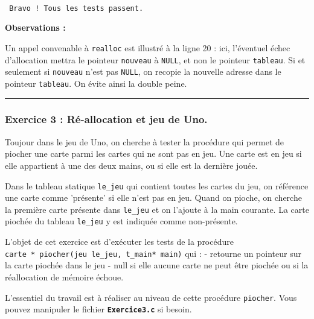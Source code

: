 \documentclass[11pt]{article}
\begin{document}
    \begin{Verbatim}[commandchars=\\\{\}]

 Bravo ! Tous les tests passent.

    \end{Verbatim}

    \textbf{Observations :}

Un appel convenable à \texttt{realloc} est illustré à la ligne 20 : ici,
l'éventuel échec d'allocation mettra le pointeur \texttt{nouveau} à
\texttt{NULL}, et non le pointeur \texttt{tableau}. Si et seulement si
\texttt{nouveau} n'est pas \texttt{NULL}, on recopie la nouvelle adresse
dans le pointeur \texttt{tableau}. On évite ainsi la double peine.

    \begin{center}\rule{0.5\linewidth}{\linethickness}\end{center}

    \subsubsection{Exercice 3 : Ré-allocation et jeu de
Uno.}\label{exercice-3-ruxe9-allocation-et-jeu-de-uno.}

Toujour dans le jeu de Uno, on cherche à tester la procédure qui permet
de piocher une carte parmi les cartes qui ne sont pas en jeu. Une carte
est en jeu si elle appartient à une des deux mains, ou si elle est la
dernière jouée.

Dans le tableau statique \texttt{le\_jeu} qui contient toutes les cartes
du jeu, on référence une carte comme 'présente' si elle n'est pas en
jeu. Quand on pioche, on cherche la première carte présente dans
\texttt{le\_jeu} et on l'ajoute à la main courante. La carte piochée du
tableau \texttt{le\_jeu} y est indiquée comme non-présente.

L'objet de cet exercice est d'exécuter les tests de la procédure
\texttt{carte\ *\ piocher(jeu\ le\_jeu,\ t\_main*\ main)} qui : -
retourne un pointeur sur la carte piochée dans le jeu - null si elle
aucune carte ne peut être piochée ou si la réallocation de mémoire
échoue.

L'essentiel du travail est à réaliser au niveau de cette procédure
\texttt{piocher}. Vous pouvez manipuler le fichier
\textbf{\texttt{Exercice3.c}} si besoin.
\end{document}
